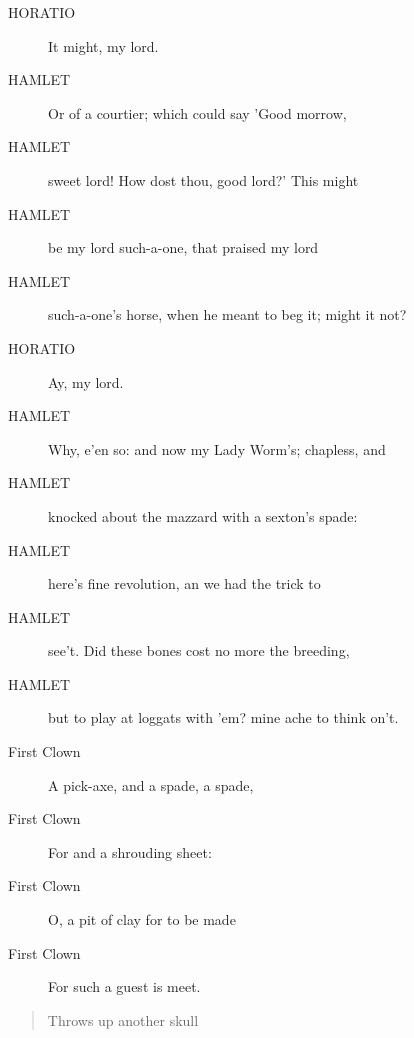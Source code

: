 \documentclass{article}
\begin{document}
\begin{description}
            
\item[HORATIO] It might, my lord.
\end{description}
          
\begin{description}
            
\item[HAMLET] Or of a courtier; which could say 'Good morrow,
\item[HAMLET] sweet lord! How dost thou, good lord?' This might
\item[HAMLET] be my lord such-a-one, that praised my lord
\item[HAMLET] such-a-one's horse, when he meant to beg it; might it not?
\end{description}
          
\begin{description}
            
\item[HORATIO] Ay, my lord.
\end{description}
          
\begin{description}
            
\item[HAMLET] Why, e'en so: and now my Lady Worm's; chapless, and
\item[HAMLET] knocked about the mazzard with a sexton's spade:
\item[HAMLET] here's fine revolution, an we had the trick to
\item[HAMLET] see't. Did these bones cost no more the breeding,
\item[HAMLET] but to play at loggats with 'em? mine ache to think on't.
\end{description}
          
\begin{description}
            
\item[First Clown] A pick-axe, and a spade, a spade,
\item[First Clown] For and a shrouding sheet:
\item[First Clown] O, a pit of clay for to be made
\item[First Clown] For such a guest is meet.
\end{description}
          
\begin{quote}
Throws up another skull
\end{quote}
          
\end{document}

